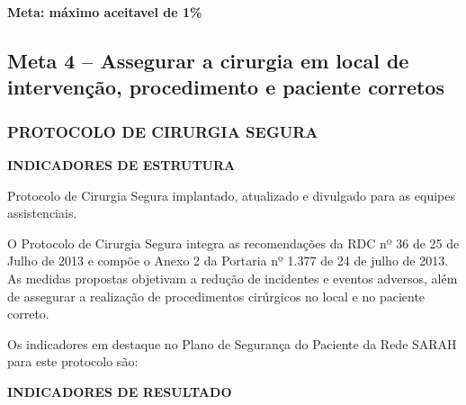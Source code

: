 \documentclass[
  a4paper]{article}
\begin{document}
\begin{center}
 \textbf{Meta: máximo aceitavel de 1\%}
\end{center}

\subsection{Meta 4 – Assegurar a cirurgia em local de intervenção, procedimento e paciente corretos}

\subsubsection{PROTOCOLO DE CIRURGIA SEGURA}

\textbf{INDICADORES DE ESTRUTURA}

Protocolo de Cirurgia Segura implantado, atualizado e divulgado para as
equipes assistenciais.

\hspace{1cm} O Protocolo de Cirurgia Segura integra as recomendações da
RDC nº 36 de 25 de Julho de 2013 e compõe o Anexo 2 da Portaria nº 1.377
de 24 de julho de 2013. As medidas propostas objetivam a redução de
incidentes e eventos adversos, além de assegurar a realização de
procedimentos cirúrgicos no local e no paciente correto.

\hspace{1cm} Os indicadores em destaque no Plano de Segurança do
Paciente da Rede SARAH para este protocolo são:

\textbf{INDICADORES DE RESULTADO}

\begin{table}[H]

\caption{\label{tab:unnamed-chunk-11}Número de cirurgias em paciente errado, programas de internação}
\centering
{}
\end{table}
\end{document}
